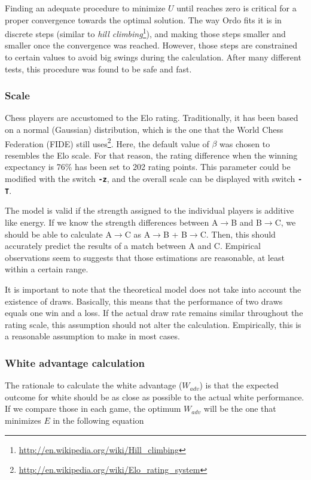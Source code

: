 \documentclass[12pt]{article}
\newcommand{\swtch} [1] {\texttt{\textbf{#1}}}
\begin{document}
Finding an adequate procedure to minimize $U$ until reaches zero is critical for a proper convergence towards the optimal solution. 
The way Ordo fits it is in discrete steps (similar to \textit{hill climbing}\footnote{\url{http://en.wikipedia.org/wiki/Hill_climbing}}), and making those steps smaller and smaller once the convergence was reached. 
However, those steps are constrained to certain values to avoid big swings during the calculation.
After many different tests, this procedure was found to be safe and fast. 

\subsubsection*{Scale}

Chess players are accustomed to the Elo rating. 
Traditionally, it has been based on a normal (Gaussian) distribution, which is the one that the World Chess Federation (FIDE) still uses\footnote{\url{http://en.wikipedia.org/wiki/Elo_rating_system}}.
Here, the default value of $\beta$ was chosen to resembles the Elo scale.  
For that reason, the rating difference when the winning expectancy is 76\% has been set to 202 rating points.
This parameter could be modified with the switch \swtch{-z}, and the overall scale can be displayed with switch \swtch{-T}.

The model is valid if the strength assigned to the individual players is additive like energy. 
If we know the strength differences between A$\to$B and B$\to$C, we should be able to calculate A$\to$C as A$\to$B + B$\to$C.
Then, this should accurately predict the results of a match between A and C. 
Empirical observations seem to suggests that those estimations are reasonable, at least within a certain range. 

It is important to note that the theoretical model does not take into account the existence of draws. 
Basically, this means that the performance of two draws equals one win and a loss.
If the actual draw rate remains similar throughout the rating scale, this assumption should not alter the calculation.
Empirically, this is a reasonable assumption to make in most cases.

\subsubsection*{White advantage calculation}

The rationale to calculate the white advantage ($W_{adv}$) is that the expected outcome for white should be as close as possible to the actual white performance.
If we compare those in each game, the optimum $W_{adv}$ will be the one that minimizes $E$ in the following equation
\end{document}
